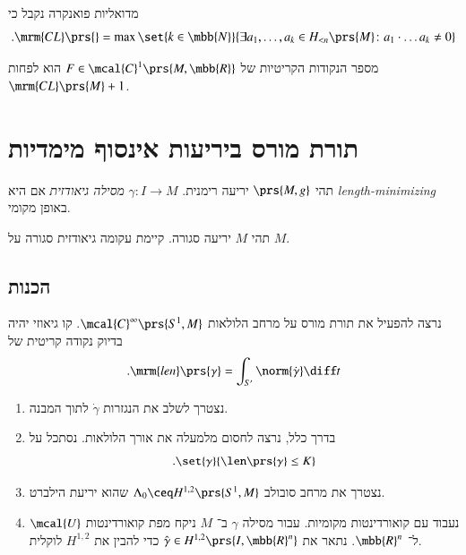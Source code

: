 \documentclass[a4paper,10pt,twoside,openany]{book}
\begin{document}
\begin{remark}
מדואליות פואנקרה נקבל כי
\[\text{.} \mrm{CL}\prs{} = \max\set{k \in \mbb{N}}{\exists a_1, \ldots, a_k \in H_{< n}\prs{M} \colon a_1 \cdot \ldots a_k \neq 0}\]
\end{remark}

\begin{corollary}
מספר הנקודות הקריטיות של
$F \in \mcal{C}^1\prs{M,\mbb{R}}$
הוא לפחות
$\mrm{CL}\prs{M} + 1$.
\end{corollary}

\chapter{תורת מורס ביריעות אינסוף מימדיות}

\begin{definition}
תהי
$\prs{M,g}$
יריעה רימנית.
$\gamma \colon I \to M$
\emph{מסילה גיאודזית}
אם
היא
\emph{length-minimizing}
באופן מקומי.
\end{definition}

\begin{theorem}
תהי
$M$
יריעה סגורה.
קיימת עקומה גיאודזית סגורה על
$M$.
\end{theorem}

\section{הכנות}

נרצה להפעיל את תורת מורס על מרחב הלולאות
$\mcal{C}^\infty\prs{S^1, M}$.
קו גיאוזי יהיה בדיוק נקודה קריטית של
\[\text{.} \mrm{len}\prs{\gamma} = \int_{S'} \norm{\dot{\gamma}} \diff t\]

\begin{remark}
\begin{enumerate}
\item נצטרך לשלב את הנגזרות
$\dot{\gamma}$
לתוך המבנה.

\item בדרך כלל, נרצה לחסום מלמעלה את אורך הלולאות. נסתכל על
\[\text{.} \set{\gamma}{\len\prs{\gamma} \leq K}\]

\item נצטרך את מרחב סובולב
$\Lambda_0 \ceq H^{1,2}\prs{S^1, M}$
שהוא יריעת הילברט.

\item נעבוד עם קואורדינטות מקומיות. עבור מסילה
$\gamma$
ב־%
$M$
ניקח מפת קואורדינטות
$\mcal{U}$
ל־%
$\mbb{R}^n$.
נתאר את
$\hat{\gamma} \in H^{1,2}\prs{I,\mbb{R}^n}$
כדי להבין את
$H^{1,2}$
לוקלית.
\end{enumerate}
\end{remark}
\end{document}
